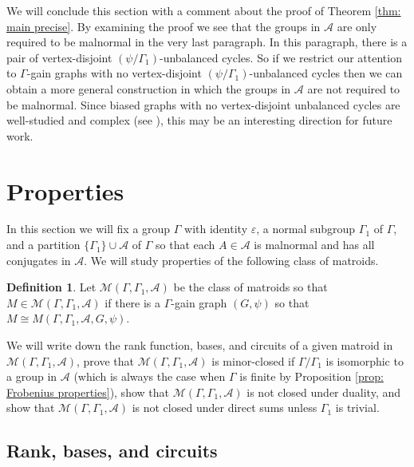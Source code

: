 \documentclass[12pt]{article}
\theoremstyle{definition}
\newtheorem{definition}[theorem]{Definition}
\newcommand{\cA}{\mathcal{A}}
\newcommand{\cM}{\mathcal{M}}
\newcommand{\ep}{\varepsilon}
\begin{document}
We will conclude this section with a comment about the proof of Theorem \ref{thm: main precise}.
By examining the proof we see that the groups in $\cA$ are only required to be malnormal in the very last paragraph.
In this paragraph, there is a pair of vertex-disjoint $(\psi/\Gamma_1)$-unbalanced cycles.
So if we restrict our attention to $\Gamma$-gain graphs with no vertex-disjoint $(\psi/\Gamma_1)$-unbalanced cycles then we can obtain a more general construction in which the groups in $\cA$ are not required to be malnormal.
Since biased graphs with no vertex-disjoint unbalanced cycles are well-studied and complex (see \cite{Chen-Pivotte-2018}), this may be an interesting direction for future work.






\section{Properties} \label{sec: properties}


In this section we will fix a group $\Gamma$ with identity $\ep$, a normal subgroup $\Gamma_1$ of $\Gamma$, and a partition $\{\Gamma_1\} \cup \cA$ of $\Gamma$ so that each $A \in \cA$ is malnormal and has all conjugates in $\cA$.
We will study properties of the following class of matroids.

\begin{definition} \label{def: the class of matroids}
Let $\cM(\Gamma, \Gamma_1, \cA)$ be the class of matroids so that $M \in \cM(\Gamma, \Gamma_1, \cA)$ if there is a $\Gamma$-gain graph $(G, \psi)$ so that $M \cong M(\Gamma, \Gamma_1, \cA, G, \psi)$.
\end{definition}


We will write down the rank function, bases, and circuits of a given matroid in $\cM(\Gamma, \Gamma_1, \cA)$, prove that $\cM(\Gamma, \Gamma_1, \cA)$ is minor-closed if $\Gamma/\Gamma_1$ is isomorphic to a group in $\cA$ (which is always the case when $\Gamma$ is finite by Proposition \ref{prop: Frobenius properties}), show that $\cM(\Gamma, \Gamma_1, \cA)$ is not closed under duality, and show that $\cM(\Gamma, \Gamma_1, \cA)$ is not closed under direct sums unless $\Gamma_1$ is trivial.



\subsection{Rank, bases, and circuits} \label{sec: rank, bases, circuits}
\end{document}
